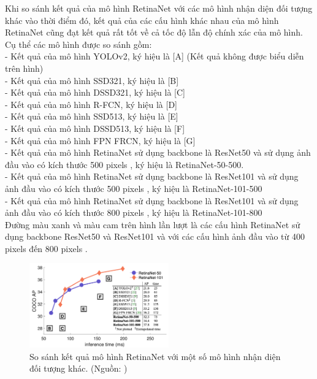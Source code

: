 {    Khi so sánh kết quả của mô hình RetinaNet  với các mô hình nhận diện đối tượng  khác vào thời điểm đó, kết quả của các cấu hình khác nhau của mô hình RetinaNet  cũng đạt kết quả rất tốt về cả tốc độ lẫn độ chính xác của mô hình.
    Cụ thể các mô hình được so sánh gồm: \\
    - Kết quả của mô hình YOLOv2,  ký hiệu là [A] \cite{redmon2016yolo9000} (Kết quả không được biểu diễn trên hình) \\
    - Kết quả của mô hình SSD321,  ký hiệu là [B] \cite{liu2016ssd} \\
    - Kết quả của mô hình DSSD321,  ký hiệu là [C] \cite{fu2017dssd} \\
    - Kết quả của mô hình R-FCN,  ký hiệu là [D] \cite{dai2016r} \\
    - Kết quả của mô hình SSD513,  ký hiệu là [E] \cite{liu2016ssd} \\
    - Kết quả của mô hình DSSD513,  ký hiệu là [F] \cite{fu2017dssd} \\
    - Kết quả của mô hình FPN  FRCN, ký hiệu là [G] \cite{lin2017feature} \\
    - Kết quả của mô hình RetinaNet  sử dụng backbone là ResNet50  và sử dụng ảnh đầu vào có kích thước 500 pixels , ký hiệu là RetinaNet-50-500. \\
    - Kết quả của mô hình RetinaNet  sử dụng backbone là ResNet101  và sử dụng ảnh đầu vào có kích thước 500 pixels , ký hiệu là RetinaNet-101-500 \\
    - Kết quả của mô hình RetinaNet  sử dụng backbone là ResNet101  và sử dụng ảnh đầu vào có kích thước 800 pixels , ký hiệu là RetinaNet-101-800 \\
    Đường màu xanh và màu cam trên hình lần lượt là các cấu hình RetinaNet  sử dụng backbone ResNet50  và ResNet101  và với các cấu hình ảnh đầu vào từ 400 pixels  đến 800 pixels .

    \begin{figure}[H]
        \centering
        \includegraphics[width=6cm] {images/retinanet_results_1}
        \caption{So sánh kết quả mô hình RetinaNet  với một số mô hình nhận diện đối tượng  khác. (Nguồn: \cite{lin2017focal})}
        \label{fig:retinanet_results_1}
    \end{figure}

}
